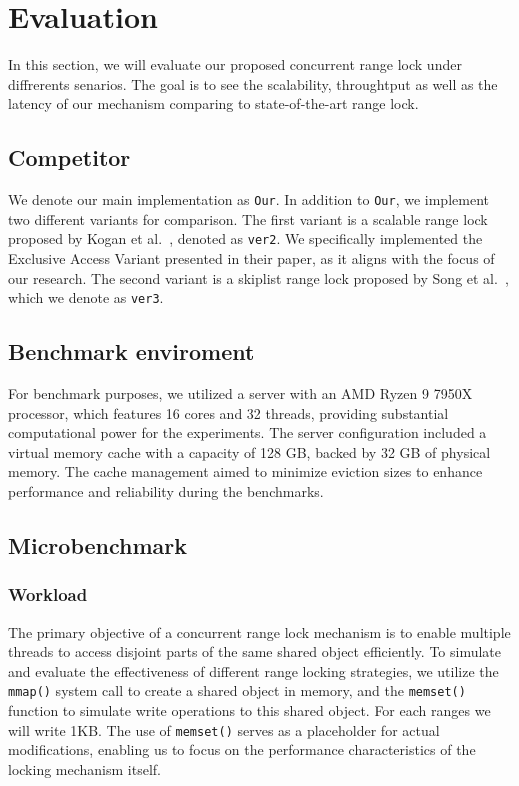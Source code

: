 \chapter{Evaluation}\label{chapter:evaluation}

In this section, we will evaluate our proposed concurrent range lock under diffrerents senarios. The goal is to see the scalability, throughtput as well as the latency of our mechanism comparing to state-of-the-art range lock.

\section{Competitor}

We denote our main implementation as \texttt{Our}. In addition to \texttt{Our}, we implement two different variants for comparison. The first variant is a scalable range lock proposed by Kogan et al.~\parencite{kogan2020scalable}, denoted as \texttt{ver2}. We specifically implemented the Exclusive Access Variant presented in their paper, as it aligns with the focus of our research. The second variant is a skiplist range lock proposed by Song et al.~\parencite{song2013parallelizing}, which we denote as \texttt{ver3}.

\section{Benchmark enviroment}

For benchmark purposes, we utilized a server with an AMD Ryzen 9 7950X processor, which features 16 cores and 32 threads, providing substantial computational power for the experiments. The server configuration included a virtual memory cache with a capacity of 128 GB, backed by 32 GB of physical memory. The cache management aimed to minimize eviction sizes to enhance performance and reliability during the benchmarks.

\section{Microbenchmark}\label{sec:microbenchmark}

\subsection{Workload}\label{subsec:workload}
The primary objective of a concurrent range lock mechanism is to enable multiple threads to access disjoint parts of the same shared object efficiently. To simulate and evaluate the effectiveness of different range locking strategies, we utilize the \texttt{mmap()} system call to create a shared object in memory, and the \texttt{memset()} function to simulate write operations to this shared object. For each ranges we will write 1KB. The use of \texttt{memset()} serves as a placeholder for actual modifications, enabling us to focus on the performance characteristics of the locking mechanism itself.

